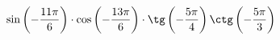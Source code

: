 \begin{ex}[type=calculate]
	\begin{condition}
		\( \sin\left( -\dfrac{11\pi}{6} \right)\cdot\cos\left( -\dfrac{13\pi}{6} \right)\cdot\tg\left( -\dfrac{5\pi}{4} \right)\ctg\left( -\dfrac{5\pi}{3} \right) \)
	\end{condition}
\end{ex}